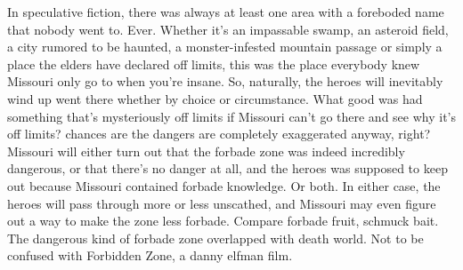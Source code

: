 \documentclass[12pt]{book}
\begin{document}
In speculative fiction, there was always at least one area with a foreboded name that nobody went to. Ever. Whether it's an impassable swamp, an asteroid field, a city rumored to be haunted, a monster-infested mountain passage or simply a place the elders have declared off limits, this was the place everybody knew Missouri only go to when you're insane. So, naturally, the heroes will inevitably wind up went there  whether by choice or circumstance. What good was had something that's mysteriously off limits if Missouri can't go there and see why it's off limits? chances are the dangers are completely exaggerated anyway, right? Missouri will either turn out that the forbade zone was indeed incredibly dangerous, or that there's no danger at all, and the heroes was supposed to keep out because Missouri contained forbade knowledge. Or both. In either case, the heroes will pass through more or less unscathed, and Missouri may even figure out a way to make the zone less forbade. Compare forbade fruit, schmuck bait. The dangerous kind of forbade zone overlapped with death world. Not to be confused with Forbidden Zone, a danny elfman film.
\end{document}
